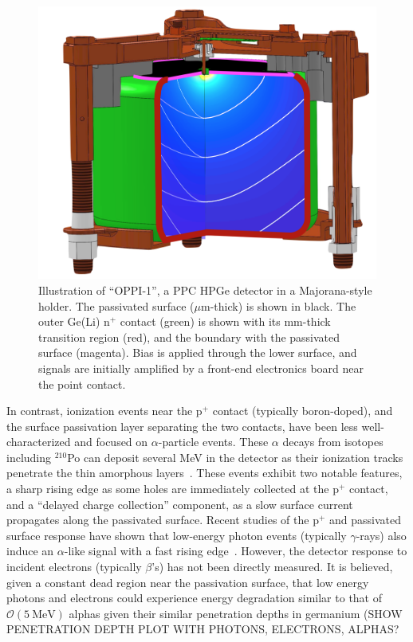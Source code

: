 \documentclass[nofootinbib,superscriptaddress, aps, prc, 
10pt, amsmath, amssymb, bibnotes,
altaffilletter, twocolumn, floatfix]{revtex4-2}
\def\MJ{{\sc Majorana}}
\begin{document}
    \begin{figure}[h]
        \includegraphics[width=0.8\columnwidth]{ppc_surfaces.png}
        \caption{Illustration of ``OPPI-1'', a PPC HPGe detector in a \MJ-style holder.
        The passivated surface ($\mu$m-thick) is shown in black.
        The outer Ge(Li) n$^+$ contact (green) is shown with its mm-thick transition region (red), and the boundary with the passivated surface (magenta).
        Bias is applied through the lower surface, and signals are initially amplified by a front-end electronics board near the point contact.
        }
        \label{fig:surfaces}
    \end{figure}
    
    In contrast, ionization events near the p$^+$ contact (typically boron-doped), and the surface passivation layer separating the two contacts, have been less well-characterized and focused on $\alpha$-particle events.
    These $\alpha$ decays from isotopes including $^{210}$Po can deposit several MeV in the detector as their ionization tracks penetrate the thin amorphous layers~\cite{majorana2018, othman2021cage, gruszko2022alpha}.
    These events exhibit two notable features, a sharp rising edge as some holes are immediately collected at the p$^+$ contact, and a ``delayed charge collection'' component, as a slow surface current propagates along the passivated surface.
    Recent studies of the p$^+$ and passivated surface response have shown that low-energy photon events (typically $\gamma$-rays) also induce an $\alpha$-like signal with a fast rising edge~\cite{othman2021cage, cdex2022passivated}.
    However, the detector response to incident electrons (typically $\beta$'s) has not been directly measured. It is believed, given a constant dead region near the passivation surface, that low energy photons and electrons could experience energy degradation similar to that of $\mathcal{O}(5~\mathrm{MeV})$ alphas given their similar penetration depths in germanium (SHOW PENETRATION DEPTH PLOT WITH PHOTONS, ELECTRONS, ALPHAS?
\end{document}
